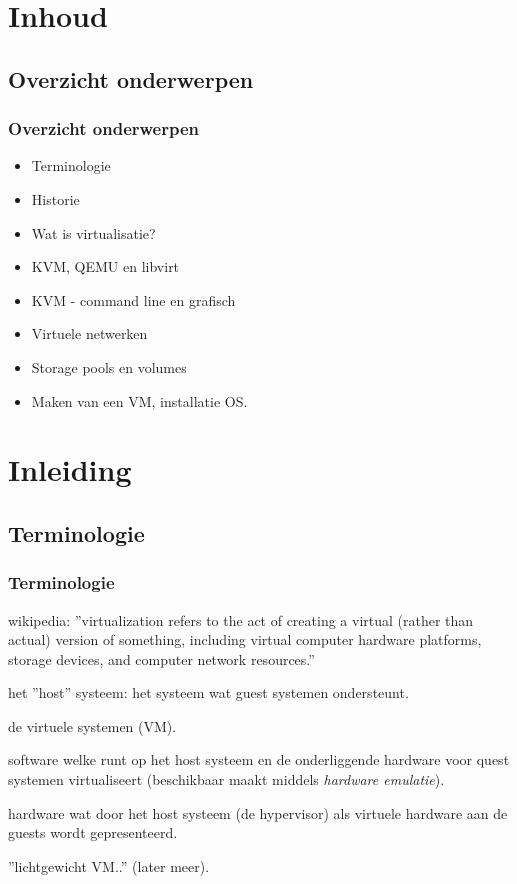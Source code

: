 \section{Inhoud}
\subsection{Overzicht onderwerpen}
\begin{styleframe}
	\frametitle{Overzicht onderwerpen}
\begin{itemize}
\item Terminologie
\item Historie
\item Wat is virtualisatie?
\item KVM, QEMU en libvirt
\item KVM - command line en grafisch
\item Virtuele netwerken
\item Storage pools en volumes
\item Maken van een VM, installatie OS.
\end{itemize}
\end{styleframe}

\section{Inleiding}
\subsection{Terminologie}
\begin{styleframe}
    \frametitle{Terminologie}
\begin{description}[blaat]
	\item[virtualisatie] wikipedia: ''virtualization refers to the act of creating a virtual (rather than actual) version of something, including virtual computer hardware platforms, storage devices, and computer network resources.''
	\pause
	\item[host] het ''host'' systeem: het systeem wat guest systemen ondersteunt.
	\pause
	\item[guest] de virtuele systemen (VM).
	\pause
	\item[hypervisor] software welke runt op het host systeem en de onderliggende hardware voor quest systemen virtualiseert (beschikbaar maakt middels {\it hardware emulatie}).
	\pause
	\item[hardware emulatie] hardware wat door het host systeem (de hypervisor) als virtuele hardware aan de guests wordt gepresenteerd.
	\pause
	\item[container] ''lichtgewicht VM..'' (later meer).
\end{description}
\end{styleframe}

